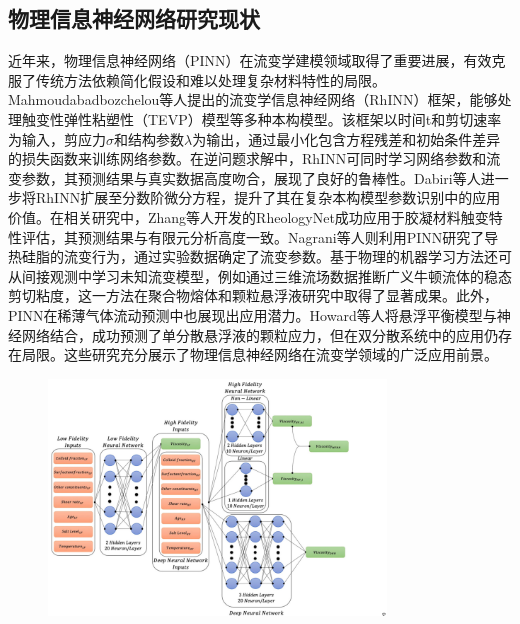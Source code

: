 \subsection{物理信息神经网络研究现状}
近年来，物理信息神经网络（PINN）在流变学建模领域取得了重要进展，有效克服了传统方法依赖简化假设和难以处理复杂材料特性的局限。Mahmoudabadbozchelou等人提出的流变学信息神经网络（RhINN）框架，能够处理触变性弹性粘塑性（TEVP）模型等多种本构模型\cite{mahmoudabadbozchelouRheologyInformedNeuralNetworks2021}。该框架以时间t和剪切速率为输入，剪应力$\sigma$和结构参数$\lambda$为输出，通过最小化包含方程残差和初始条件差异的损失函数来训练网络参数。在逆问题求解中，RhINN可同时学习网络参数和流变参数，其预测结果与真实数据高度吻合，展现了良好的鲁棒性。Dabiri等人进一步将RhINN扩展至分数阶微分方程，提升了其在复杂本构模型参数识别中的应用价值\cite{dabiri2023}。在相关研究中，Zhang等人开发的RheologyNet成功应用于胶凝材料触变特性评估，其预测结果与有限元分析高度一致\cite{zhangRheologyNetPhysicsinformedNeural2023}。Nagrani等人则利用PINN研究了导热硅脂的流变行为，通过实验数据确定了流变参数\cite{nagrani2023}。基于物理的机器学习方法还可从间接观测中学习未知流变模型，例如通过三维流场数据推断广义牛顿流体的稳态剪切粘度，这一方法在聚合物熔体和颗粒悬浮液研究中取得了显著成果。此外，PINN在稀薄气体流动预测中也展现出应用潜力\cite{tucnyLearningViscosityFunctions2024}。Howard等人将悬浮平衡模型与神经网络结合，成功预测了单分散悬浮液的颗粒应力，但在双分散系统中的应用仍存在局限。这些研究充分展示了物理信息神经网络在流变学领域的广泛应用前景\cite{howardMachineLearningMethods2023}。
\begin{figure}[htbp]
	\centering
	\includegraphics[width=0.8\textwidth]{Fig/MFNN.png}
\end{figure}

